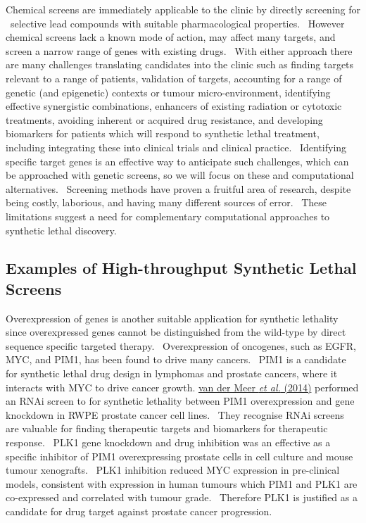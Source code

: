 Chemical screens are immediately applicable to the clinic by directly
screening for \ selective lead compounds with suitable pharmacological
properties. \ However chemical screens lack a known mode of action, may
affect many targets, and screen a narrow range of genes with existing
drugs. \ With either approach there are many challenges translating
candidates into the clinic such as finding targets relevant to a range
of patients, validation of targets, accounting for a range of genetic
(and epigenetic) contexts or tumour micro-environment, identifying
effective synergistic combinations, enhancers of existing radiation or
cytotoxic treatments, avoiding inherent or acquired drug resistance,
and developing biomarkers for patients which will respond to synthetic
lethal treatment, including integrating these into clinical trials and
clinical practice. \ Identifying specific target genes is an effective
way to anticipate such challenges, which can be approached with genetic
screens, so we will focus on these and computational alternatives.
\ Screening methods have proven a fruitful area of research, despite
being costly, laborious, and having many different sources of error.
\ These limitations suggest a need for complementary computational
approaches to synthetic lethal discovery. \ 


\subsection[Examples of High{}-throughput Synthetic Lethal
Screens]{Examples of High-throughput Synthetic Lethal Screens}

Overexpression of genes is another suitable application for synthetic
lethality since overexpressed genes cannot be distinguished from the
wild-type by direct sequence specific targeted therapy.
\ Overexpression of oncogenes, such as EGFR, MYC, and PIM1, has been
found to drive many cancers. \ PIM1 is a candidate for synthetic lethal
drug design in lymphomas and prostate cancers, where it interacts with
MYC to drive cancer growth. \hyperlink{ENREF103}{van der
Meer}\hyperlink{ENREF103}{\textit{ et al.}}\hyperlink{ENREF103}{
(2014)} performed an RNAi screen to for synthetic lethality between
PIM1 overexpression and gene knockdown in RWPE prostate cancer cell
lines. \ They recognise RNAi screens are valuable for finding
therapeutic targets and biomarkers for therapeutic response. \ PLK1
gene knockdown and drug inhibition was an effective as a specific
inhibitor of PIM1 overexpressing prostate cells in cell culture and
mouse tumour xenografts. \ PLK1 inhibition reduced MYC expression in
pre-clinical models, consistent with expression in human tumours which
PIM1 and PLK1 are co-expressed and correlated with tumour grade.
\ Therefore PLK1 is justified as a candidate for drug target against
prostate cancer progression. \ 


